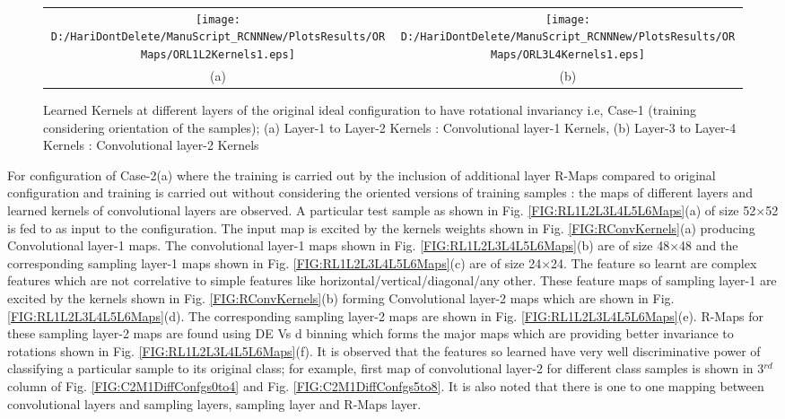 \begin{figure*}
\begin{tabular}{cc}
\texttt{[image: D:/HariDontDelete/ManuScript\_RCNNNew/PlotsResults/ORMaps/ORL1L2Kernels1.eps]}&\texttt{[image: D:/HariDontDelete/ManuScript\_RCNNNew/PlotsResults/ORMaps/ORL3L4Kernels1.eps]}\\
(a)  & (b) \\
\end{tabular}
\caption{ Learned Kernels at different layers of the original ideal configuration to have rotational invariancy i.e, Case-1 (training considering orientation of the samples); (a) Layer-1 to Layer-2 Kernels : Convolutional layer-1 Kernels, (b) Layer-3 to Layer-4 Kernels : Convolutional layer-2 Kernels}
\label{FIG:ORConvKernels}
\end{figure*}


For configuration of Case-2(a) where the training is carried out by the inclusion of additional layer R-Maps compared to original configuration and training is carried out without considering the oriented versions of training samples : the maps of different layers and learned kernels of convolutional layers are observed. A particular test sample as shown in Fig. \ref{FIG:RL1L2L3L4L5L6Maps}(a) of size 52$\times$52 is fed to as input to the configuration. The input map is excited by the kernels weights shown in Fig. \ref{FIG:RConvKernels}(a) producing Convolutional layer-1 maps. The convolutional layer-1 maps shown in Fig. \ref{FIG:RL1L2L3L4L5L6Maps}(b) are of size 48$\times$48 and the corresponding sampling layer-1 maps shown in Fig. \ref{FIG:RL1L2L3L4L5L6Maps}(c) are of size 24$ 
\times$24. The feature so learnt are complex features which are not correlative to simple features like horizontal/vertical/diagonal/any other. These feature maps of sampling layer-1 are excited by the kernels shown in Fig. \ref{FIG:RConvKernels}(b) forming Convolutional layer-2 maps which are shown in Fig. \ref{FIG:RL1L2L3L4L5L6Maps}(d). The corresponding sampling layer-2 maps are shown in Fig. \ref{FIG:RL1L2L3L4L5L6Maps}(e). R-Maps for these sampling layer-2 maps are found using DE Vs d binning which forms the major maps which are providing better invariance to rotations shown in Fig. \ref{FIG:RL1L2L3L4L5L6Maps}(f). It is observed that the features so learned have very well discriminative power of classifying a particular sample to its original class; for example, first map of convolutional layer-2 for different class samples is shown in 3$^{rd}$ column of Fig. \ref{FIG:C2M1DiffConfgs0to4} and Fig. \ref{FIG:C2M1DiffConfgs5to8}. It is also noted that there is one to one mapping between convolutional layers and sampling layers, sampling layer and R-Maps layer.\\


